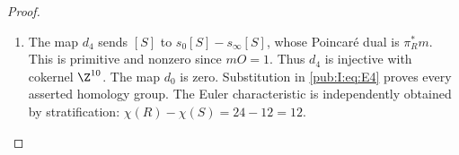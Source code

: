 \begin{proof}
\begin{enumerate}[label=\arabic*.,leftmargin=*]
\item The map $d_4$ sends $[S]$ to $s_0[S]-s_\infty[S]$, whose Poincar\'e
dual is $\pi_R^*m$. This is primitive and nonzero since $mO=1$.
Thus $d_4$ is injective with cokernel $\Z^{10}$. The map $d_0$ is
zero. Substitution in \eqref{pub:I:eq:E4} proves every asserted homology group.
The Euler characteristic is independently obtained by stratification:
$\chi(R)-\chi(S)=24-12=12$. 
\end{enumerate}
\end{proof}

